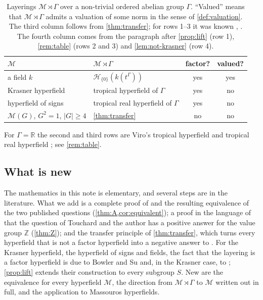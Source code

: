 \documentclass[11pt]{amsart}
\numberwithin{equation}{section}
\newcommand{\Mas}{\mathcal M}
\newcommand{\Z}{\mathbb Z}
\begin{document}
\begin{table}[htbp]
\centering
\caption{Layerings $\Mas\rtimes\Gamma$ over a non-trivial ordered abelian group $\Gamma$. ``Valued'' means that $\Mas\rtimes\Gamma$ admits a valuation of some norm in the sense of \cref{def:valuation}. The third column follows from \cref{thm:transfer}; for rows 1--3 it was known \cite[proof of Theorem~7.5, Cases~1--3]{BowlerSu21}, \cite[Proposition~2.17(iv)]{Linzi25}. The fourth column comes from the paragraph after \cref{prop:lift} (row 1), \cref{rem:table} (rows 2 and 3) and \cref{lem:not-krasner} (row 4).}\label{tab:examples}
\begin{tabular}{@{}llcc@{}}
\toprule
$\Mas$ & $\Mas\rtimes\Gamma$ & factor? & valued? \\
\midrule
a field $k$ & $\mathcal H_{\{0\}}(k(t^\Gamma))$ & yes & yes \\
Krasner hyperfield & tropical hyperfield of $\Gamma$ & yes & no \\
hyperfield of signs & tropical real hyperfield of $\Gamma$ & yes & no \\
$\Mas(G)$, $G^2=1$, $|G|\ge4$ & \cref{thm:transfer} & no & no \\
\bottomrule
\end{tabular}
\end{table}

For $\Gamma=\mathbb R$ the second and third rows are Viro's tropical hyperfield and tropical real hyperfield \cite[\S\S5.3 and~7.2]{Viro10}; see \cref{rem:table}.

\subsection{What is new}
The mathematics in this note is elementary, and several steps are in the literature. What we add is a complete proof of \cite[Proposition~4.11]{Linzi25} and the resulting equivalence of the two published questions (\cref{thm:A,cor:equivalent}); a proof in the language of \cite{LT25} that the question of Touchard and the author has a positive answer for the value group $\Z$ (\cref{thm:Z}); and the transfer principle of \cref{thm:transfer}, which turns every hyperfield that is not a factor hyperfield into a negative answer to \cite[\S7(2)]{Linzi25}. For the Krasner hyperfield, the hyperfield of signs and fields, the fact that the layering is a factor hyperfield is due to Bowler and Su \cite[proof of Theorem~7.5, Cases~1--3]{BowlerSu21} and, in the Krasner case, to \cite[Proposition~2.17(iv)]{Linzi25}; \cref{prop:lift} extends their construction to every subgroup $S$. New are the equivalence for every hyperfield $\Mas$, the direction from $\Mas\rtimes\Gamma$ to $\Mas$ written out in full, and the application to Massouros hyperfields.
\end{document}
